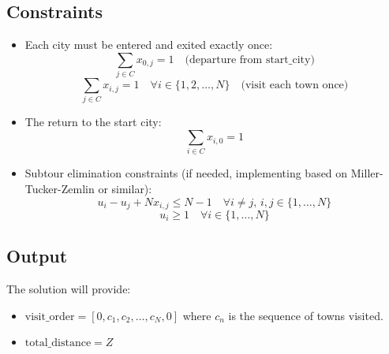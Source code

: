 \documentclass{article}
\begin{document}
\subsection*{Constraints}
\begin{itemize}
    \item Each city must be entered and exited exactly once:
    \[
    \sum_{j \in C} x_{0,j} = 1 \quad \text{(departure from start\_city)}
    \]
    \[
    \sum_{j \in C} x_{i,j} = 1 \quad \forall i \in \{1, 2, \ldots, N\} \quad \text{(visit each town once)}
    \]
    \item The return to the start city:
    \[
    \sum_{i \in C} x_{i,0} = 1
    \]
    \item Subtour elimination constraints (if needed, implementing based on Miller-Tucker-Zemlin or similar):
    \[
    u_i - u_j + N x_{i,j} \leq N-1 \quad \forall i \neq j, \, i,j \in \{1, \ldots, N\}
    \]
    \[
    u_i \geq 1 \quad \forall i \in \{1, \ldots, N\}
    \]
\end{itemize}

\subsection*{Output}
The solution will provide:
\begin{itemize}
    \item \( \text{visit\_order} = [0, c_1, c_2, \ldots, c_N, 0] \) where \( c_n \) is the sequence of towns visited.
    \item \( \text{total\_distance} = Z \)
\end{itemize}
\end{document}
